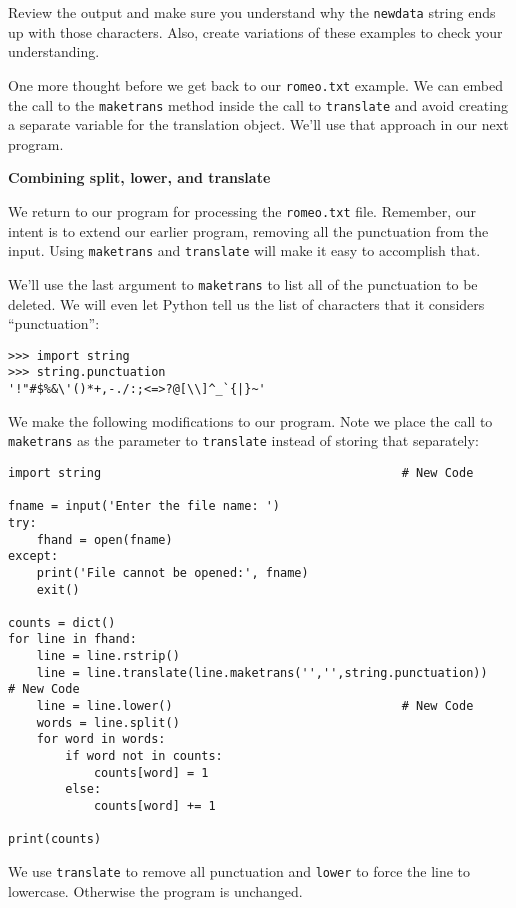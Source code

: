 Review the output and make sure you understand why the {\tt newdata} string ends up with those characters. Also, create variations of these examples to check your understanding.

One more thought before we get back to our {\tt romeo.txt} example. We can embed the call to the {\tt maketrans} method inside the call to {\tt translate} and avoid creating a separate variable for the translation object. We'll use that approach in our next program.

{\bf Combining split, lower, and translate}

We return to our program for processing the {\tt romeo.txt} file. Remember, our intent is to extend our earlier program, removing all the punctuation from the input. Using {\tt maketrans} and {\tt translate} will make it easy to accomplish that.

We'll use the last argument to {\tt maketrans} to list all of the punctuation to be deleted.
We will even let Python tell us the list of characters
that it considers ``punctuation'':

\beforeverb
\begin{verbatim}
>>> import string
>>> string.punctuation
'!"#$%&\'()*+,-./:;<=>?@[\\]^_`{|}~'
\end{verbatim}
\afterverb
%
We make the following modifications to our program. Note we place the call to {\tt maketrans} as the parameter to {\tt translate} instead of storing that separately:

\beforeverb
\begin{verbatim}
import string                                          # New Code

fname = input('Enter the file name: ')
try:
    fhand = open(fname)
except:
    print('File cannot be opened:', fname)
    exit()

counts = dict()
for line in fhand:
    line = line.rstrip()
    line = line.translate(line.maketrans('','',string.punctuation))    # New Code
    line = line.lower()                                # New Code
    words = line.split()
    for word in words:
        if word not in counts:
            counts[word] = 1
        else:
            counts[word] += 1

print(counts)
\end{verbatim}
\afterverb
%
We use {\tt translate} to remove all punctuation and {\tt lower} to 
force the line to lowercase.  Otherwise the program is unchanged.

